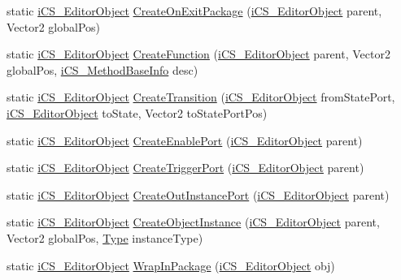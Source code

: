 \begin{DoxyCompactItemize}
\item 
static \hyperlink{classi_c_s___editor_object}{i\+C\+S\+\_\+\+Editor\+Object} \hyperlink{classi_c_s___user_commands_ade27146b75461dd4c5333f29a8085d62}{Create\+On\+Exit\+Package} (\hyperlink{classi_c_s___editor_object}{i\+C\+S\+\_\+\+Editor\+Object} parent, Vector2 global\+Pos)
\item 
static \hyperlink{classi_c_s___editor_object}{i\+C\+S\+\_\+\+Editor\+Object} \hyperlink{classi_c_s___user_commands_a508d45ff896e40df041d606a29fe2186}{Create\+Function} (\hyperlink{classi_c_s___editor_object}{i\+C\+S\+\_\+\+Editor\+Object} parent, Vector2 global\+Pos, \hyperlink{classi_c_s___method_base_info}{i\+C\+S\+\_\+\+Method\+Base\+Info} desc)
\item 
static \hyperlink{classi_c_s___editor_object}{i\+C\+S\+\_\+\+Editor\+Object} \hyperlink{classi_c_s___user_commands_ad6d570d5f13e4bf4ca4f05d34c1107ae}{Create\+Transition} (\hyperlink{classi_c_s___editor_object}{i\+C\+S\+\_\+\+Editor\+Object} from\+State\+Port, \hyperlink{classi_c_s___editor_object}{i\+C\+S\+\_\+\+Editor\+Object} to\+State, Vector2 to\+State\+Port\+Pos)
\item 
static \hyperlink{classi_c_s___editor_object}{i\+C\+S\+\_\+\+Editor\+Object} \hyperlink{classi_c_s___user_commands_aceed66a59f61035dc68dfcad94690a8b}{Create\+Enable\+Port} (\hyperlink{classi_c_s___editor_object}{i\+C\+S\+\_\+\+Editor\+Object} parent)
\item 
static \hyperlink{classi_c_s___editor_object}{i\+C\+S\+\_\+\+Editor\+Object} \hyperlink{classi_c_s___user_commands_aa86f01c5ff40027c39c234bbbf7ded7e}{Create\+Trigger\+Port} (\hyperlink{classi_c_s___editor_object}{i\+C\+S\+\_\+\+Editor\+Object} parent)
\item 
static \hyperlink{classi_c_s___editor_object}{i\+C\+S\+\_\+\+Editor\+Object} \hyperlink{classi_c_s___user_commands_aabb956d1c7fbc2e36fc24beb9ae923f1}{Create\+Out\+Instance\+Port} (\hyperlink{classi_c_s___editor_object}{i\+C\+S\+\_\+\+Editor\+Object} parent)
\item 
static \hyperlink{classi_c_s___editor_object}{i\+C\+S\+\_\+\+Editor\+Object} \hyperlink{classi_c_s___user_commands_ae80d3fa9a527794ede84550cfe566ece}{Create\+Object\+Instance} (\hyperlink{classi_c_s___editor_object}{i\+C\+S\+\_\+\+Editor\+Object} parent, Vector2 global\+Pos, \hyperlink{i_c_s___object_type_enum_8cs_ae6c3dd6d8597380b56d94908eb431547aa1fa27779242b4902f7ae3bdd5c6d508}{Type} instance\+Type)
\item 
static \hyperlink{classi_c_s___editor_object}{i\+C\+S\+\_\+\+Editor\+Object} \hyperlink{classi_c_s___user_commands_a6adca614e3114cf48bf36f41834db5ce}{Wrap\+In\+Package} (\hyperlink{classi_c_s___editor_object}{i\+C\+S\+\_\+\+Editor\+Object} obj)

\end{DoxyCompactItemize}

